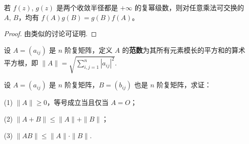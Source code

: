 \documentclass[../../main.tex]{subfiles}
\begin{document}
\begin{corollary}\label{corollary:矩阵幂级数乘法可交换}
若 $f(z)$, $g(z)$ 是两个收敛半径都是 $+\infty$ 的复幂级数，则对任意乘法可交换的 $A$, $B$，均有 $f(A)g(B)=g(B)f(A)$。 
\end{corollary}
\begin{proof}
由类似的讨论可证明.
\end{proof}

\begin{definition}[矩阵的范数]\label{definition:矩阵的范数}
设 $A=(a_{ij})$ 是 $n$ 阶复矩阵，定义 $A$ 的\textbf{范数}为其所有元素模长的平方和的算术平方根，即 $\|A\| = \sqrt{\sum_{i,j = 1}^{n}|a_{ij}|^2}$.
\end{definition}

\begin{proposition}[矩阵的范数的基本性质]\label{proposition:矩阵的范数的基本性质}
设 $A=(a_{ij})$ 是 $n$ 阶复矩阵，$B=(b_{ij})$ 也是 $n$ 阶复矩阵，求证：

(1) $\|A\|\geqslant  0$，等号成立当且仅当 $A = O$；

(2) $\|A + B\|\leqslant  \|A\| + \|B\|$；

(3) $\|AB\|\leqslant  \|A\|\cdot\|B\|$.
\end{proposition}
\end{document}
